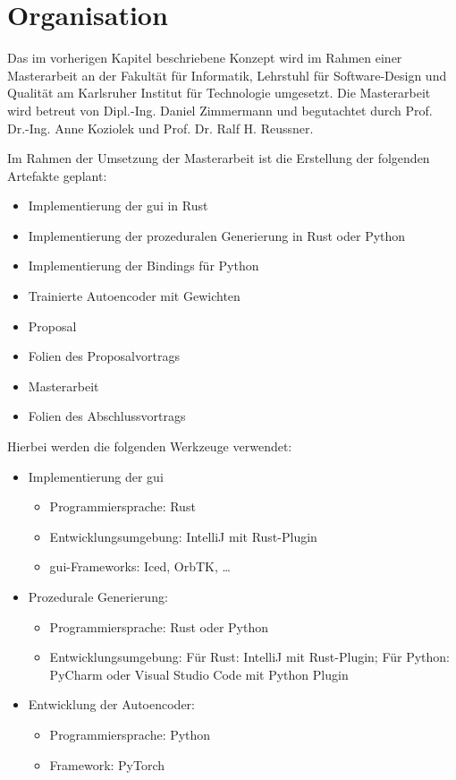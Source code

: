 \chapter{Organisation}
Das im vorherigen Kapitel beschriebene Konzept wird im Rahmen einer Masterarbeit an der Fakultät für Informatik, Lehrstuhl für Software-Design und Qualität am Karlsruher Institut für Technologie umgesetzt. Die Masterarbeit wird betreut von Dipl.-Ing. Daniel Zimmermann und begutachtet durch Prof. Dr.-Ing. Anne Koziolek und Prof. Dr. Ralf H. Reussner.

Im Rahmen der Umsetzung der Masterarbeit ist die Erstellung der folgenden Artefakte geplant:
\begin{itemize}
    \item Implementierung der \gls{gui} in Rust
    \item Implementierung der prozeduralen Generierung in Rust oder Python
    \item Implementierung der Bindings für Python
    \item Trainierte Autoencoder mit Gewichten
    \item Proposal
    \item Folien des Proposalvortrags
    \item Masterarbeit
    \item Folien des Abschlussvortrags
\end{itemize}

\noindent Hierbei werden die folgenden Werkzeuge verwendet:
\begin{itemize}
    \item Implementierung der \gls{gui}
    \begin{itemize}
        \item Programmiersprache: Rust
        \item Entwicklungsumgebung: IntelliJ mit Rust-Plugin
        \item \gls{gui}-Frameworks: Iced, OrbTK, \dots
    \end{itemize}
    \item Prozedurale Generierung:
    \begin{itemize}
        \item Programmiersprache: Rust oder Python
        \item Entwicklungsumgebung: Für Rust: IntelliJ mit Rust-Plugin; Für Python: PyCharm oder Visual Studio Code mit Python Plugin
    \end{itemize}
    \item Entwicklung der Autoencoder:
    \begin{itemize}
        \item Programmiersprache: Python
        \item Framework: PyTorch
    \end{itemize}
\end{itemize}
